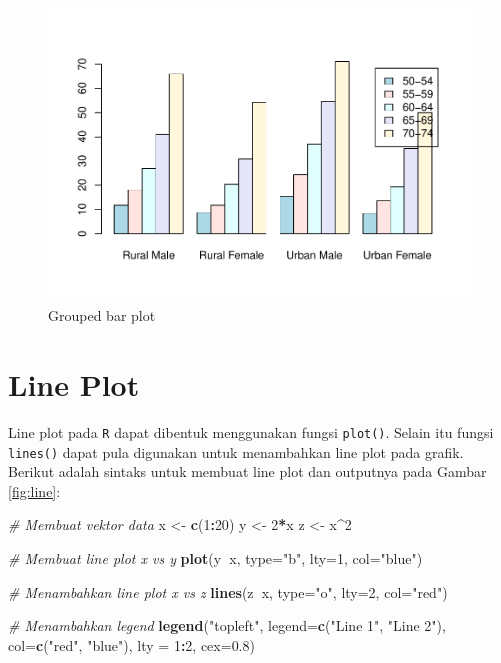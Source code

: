 \documentclass[]{book}
\newenvironment{Shaded}{\begin{snugshade}}{\end{snugshade}}
\newcommand{\KeywordTok}[1]{\textcolor[rgb]{0.13,0.29,0.53}{\textbf{#1}}}
\newcommand{\DataTypeTok}[1]{\textcolor[rgb]{0.13,0.29,0.53}{#1}}
\newcommand{\DecValTok}[1]{\textcolor[rgb]{0.00,0.00,0.81}{#1}}
\newcommand{\FloatTok}[1]{\textcolor[rgb]{0.00,0.00,0.81}{#1}}
\newcommand{\StringTok}[1]{\textcolor[rgb]{0.31,0.60,0.02}{#1}}
\newcommand{\CommentTok}[1]{\textcolor[rgb]{0.56,0.35,0.01}{\textit{#1}}}
\newcommand{\OperatorTok}[1]{\textcolor[rgb]{0.81,0.36,0.00}{\textbf{#1}}}
\newcommand{\NormalTok}[1]{#1}
\begin{document}
\begin{figure}

{\centering \includegraphics[width=0.7\linewidth]{EnvStat_files/figure-latex/barplot4-1} 

}

\caption{Grouped bar plot}\label{fig:barplot4}
\end{figure}

\section{Line Plot}\label{line-plot}

Line plot pada \texttt{R} dapat dibentuk menggunakan fungsi
\texttt{plot()}. Selain itu fungsi \texttt{lines()} dapat pula digunakan
untuk menambahkan line plot pada grafik. Berikut adalah sintaks untuk
membuat line plot dan outputnya pada Gambar \ref{fig:line}:

\begin{Shaded}
\begin{Highlighting}[]
\CommentTok{# Membuat vektor data}
\NormalTok{x <-}\StringTok{ }\KeywordTok{c}\NormalTok{(}\DecValTok{1}\OperatorTok{:}\DecValTok{20}\NormalTok{)}
\NormalTok{y <-}\StringTok{ }\DecValTok{2}\OperatorTok{*}\NormalTok{x}
\NormalTok{z <-}\StringTok{ }\NormalTok{x}\OperatorTok{^}\DecValTok{2}

\CommentTok{# Membuat line plot x vs y}
\KeywordTok{plot}\NormalTok{(y}\OperatorTok{~}\NormalTok{x, }\DataTypeTok{type=}\StringTok{"b"}\NormalTok{,}
     \DataTypeTok{lty=}\DecValTok{1}\NormalTok{,}
     \DataTypeTok{col=}\StringTok{"blue"}\NormalTok{)}

\CommentTok{# Menambahkan line plot x vs z}
\KeywordTok{lines}\NormalTok{(z}\OperatorTok{~}\NormalTok{x, }\DataTypeTok{type=}\StringTok{"o"}\NormalTok{,}
      \DataTypeTok{lty=}\DecValTok{2}\NormalTok{,}
      \DataTypeTok{col=}\StringTok{"red"}\NormalTok{)}

\CommentTok{# Menambahkan legend}
\KeywordTok{legend}\NormalTok{(}\StringTok{"topleft"}\NormalTok{, }\DataTypeTok{legend=}\KeywordTok{c}\NormalTok{(}\StringTok{"Line 1"}\NormalTok{, }\StringTok{"Line 2"}\NormalTok{),}
       \DataTypeTok{col=}\KeywordTok{c}\NormalTok{(}\StringTok{"red"}\NormalTok{, }\StringTok{"blue"}\NormalTok{), }\DataTypeTok{lty =} \DecValTok{1}\OperatorTok{:}\DecValTok{2}\NormalTok{, }\DataTypeTok{cex=}\FloatTok{0.8}\NormalTok{)}
\end{Highlighting}
\end{Shaded}
\end{document}

